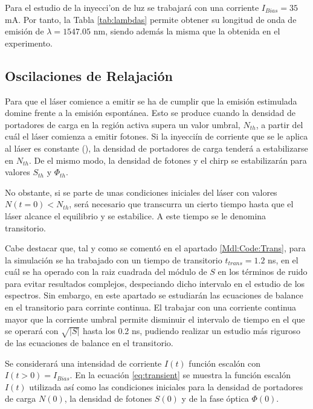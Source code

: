 	Para el estudio de la inyecci'on de luz se trabajar\'a con una corriente $I_{Bias} = 35$ mA. Por tanto, la Tabla \ref{tab:lambdas} permite obtener su longitud de onda de emisi\'on de $\lambda = 1547.05$ nm, siendo adem\'as la misma que la obtenida en el experimento.

\subsection{Oscilaciones de Relajaci\'on}

	Para que el l\'aser comience a emitir se ha de cumplir que la emisi\'on estimulada domine frente a la emisi\'on espont\'anea. Esto se produce cuando la densidad de portadores de carga en la regi\'on activa supera un valor umbral, $N_{th}$, a partir del cu\'al el l\'aser comienza a emitir fotones. Si la inyecci\'in de corriente que se le aplica al l\'aser es constante (\cw), la densidad de portadores de carga tender\'a a estabilizarse en $N_{th}$. De el mismo modo, la densidad de fotones y el chirp se estabilizar\'an para valores $S_{th}$ y $\Phi_{th}$.

	No obstante, si se parte de unas condiciones iniciales del l\'aser con valores $N(t=0) < N_{th}$, ser\'a necesario que transcurra un cierto tiempo hasta que el l\'aser alcance el equilibrio y se estabilice. A este tiempo se le denomina transitorio.

	Cabe destacar que, tal y como se coment\'o en el apartado \ref{Mdl:Code:Trans}, para la simulación se ha trabajado con un tiempo de transitorio $t_{trans} = 1.2$ ns, en el cu\'al se ha operado con la raiz cuadrada del m\'odulo de $S$ en los t\'erminos de ruido para evitar resultados complejos, despeciando dicho intervalo en el estudio de los espectros. Sin embargo, en este apartado se estudiar\'an las ecuaciones de balance en el transitorio para corrinte continua. El trabajar con una corriente continua mayor que la corriente umbral permite disminuir el intervalo de tiempo en el que se operar\'a con $\sqrt{|S|}$ hasta los 0.2 ns, pudiendo realizar un estudio m\'as riguroso de las ecuaciones de balance en el transitorio.

	Se considerar\'a una intensidad de corriente $I(t)$ funci\'on escal\'on con $I(t>0) = I_{Bias}$. En la ecuaci\'on \ref{eq:transient} se muestra la funci\'on escal\'on $I(t)$ utilizada as\'i como las condiciones iniciales para la densidad de portadores de carga $N(0)$, la densidad de fotones $S(0)$ y de la fase \'optica $\Phi(0)$.

